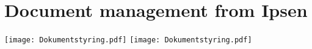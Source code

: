 
\chapter{Document management from Ipsen} \label{bilag:PiasPPT}


\texttt{[image: Dokumentstyring.pdf]}
\texttt{[image: Dokumentstyring.pdf]}


